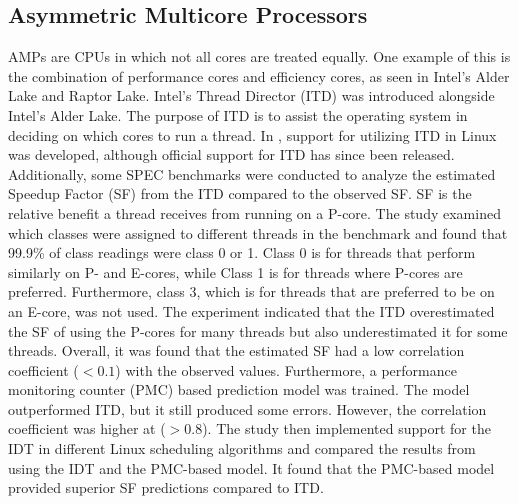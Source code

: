 \subsection{Asymmetric Multicore Processors}
AMPs are CPUs in which not all cores are treated equally. One example of this is the combination of performance cores and efficiency cores, as seen in Intel's Alder Lake and Raptor Lake. Intel's Thread Director (ITD) was introduced alongside Intel's Alder Lake. The purpose of ITD is to assist the operating system in deciding on which cores to run a thread.
In \cite{saez2022evaluation}, support for utilizing ITD in Linux was developed, although official support for ITD has since been released. Additionally, some SPEC benchmarks were conducted to analyze the estimated Speedup Factor (SF) from the ITD compared to the observed SF. SF is the relative benefit a thread receives from running on a P-core. The study examined which classes were assigned to different threads in the benchmark and found that 99.9\% of class readings were class 0 or 1. Class 0 is for threads that perform similarly on P- and E-cores, while Class 1 is for threads where P-cores are preferred.\cite{Intel202?whitepaper} Furthermore, class 3, which is for threads that are preferred to be on an E-core, was not used. The experiment indicated that the ITD overestimated the SF of using the P-cores for many threads but also underestimated it for some threads. Overall, it was found that the estimated SF had a low correlation coefficient ($<0.1$) with the observed values. Furthermore, a performance monitoring counter (PMC) based prediction model was trained. The model outperformed ITD, but it still produced some errors. However, the correlation coefficient was higher at ($>0.8$). The study then implemented support for the IDT in different Linux scheduling algorithms and compared the results from using the IDT and the PMC-based model. It found that the PMC-based model provided superior SF predictions compared to ITD.\cite{saez2022evaluation}